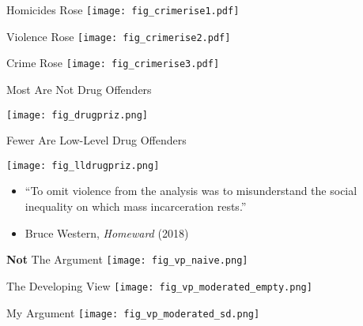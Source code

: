 \documentclass{beamer}
\begin{document}
\begin{frame}{Homicides Rose}
\texttt{[image: fig\_crimerise1.pdf]}
\end{frame}

\begin{frame}{Violence Rose}
\texttt{[image: fig\_crimerise2.pdf]}
\end{frame}

\begin{frame}{Crime Rose}
\texttt{[image: fig\_crimerise3.pdf]}
\end{frame}

\begin{frame}{Most Are Not Drug Offenders}
\begin{center}
    \texttt{[image: fig\_drugpriz.png]}
\end{center}
\end{frame}

\begin{frame}{Fewer Are Low-Level Drug Offenders}
\begin{center}
    \texttt{[image: fig\_lldrugpriz.png]}
\end{center}
\end{frame}

\begin{frame}{}
\begin{itemize}
    \item[] ``To omit violence from the analysis was to misunderstand the social inequality on which mass incarceration rests.'' \\
    \item[] Bruce Western, \textit{Homeward} (2018)
\end{itemize}
\end{frame}

\begin{frame}{\textbf{Not} The Argument}
\texttt{[image: fig\_vp\_naive.png]}
\end{frame}

\begin{frame}{The Developing View}
\texttt{[image: fig\_vp\_moderated\_empty.png]}
\end{frame}

\begin{frame}{My Argument}
\texttt{[image: fig\_vp\_moderated\_sd.png]}
\end{frame}
\end{document}
